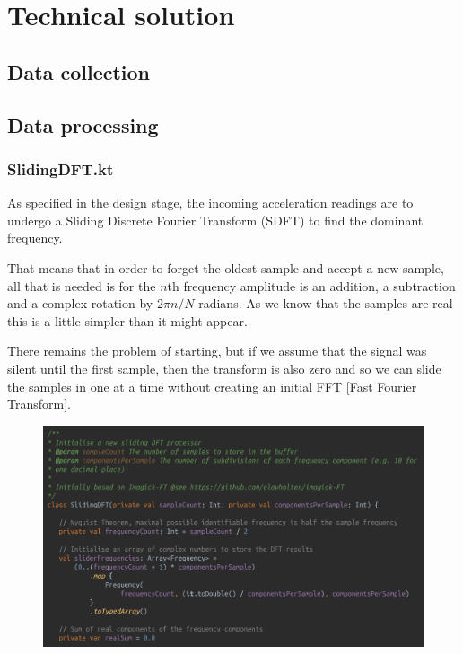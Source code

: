 \documentclass[11pt,twoside,a4paper]{report}
\begin{document}
\chapter{Technical solution}

\section{Data collection}

\section{Data processing}

\subsection{SlidingDFT.kt}

As specified in the design stage, the incoming acceleration readings are to undergo a Sliding Discrete Fourier Transform (SDFT) to find the dominant frequency.

\begin{displayquote}
  That means that in order to forget the oldest sample and accept a new sample, all that is needed is for the $n$th frequency amplitude is an addition, a subtraction and a complex rotation by $2\pi n / N$ radians. As we know that the samples are real this is a little simpler than it might appear.

  There remains the problem of starting, but if we assume that the signal was silent until the first sample, then the transform is also zero and so we can slide the samples in one at a time without creating an initial FFT [Fast Fourier Transform].
\end{displayquote}

\begin{figure}[h!]
  \centering
  \includegraphics[width=1.0\textwidth]{code-slidingDFT.png}
  \caption{}
  \label{fig:slidingDFT}
\end{figure}
\end{document}
